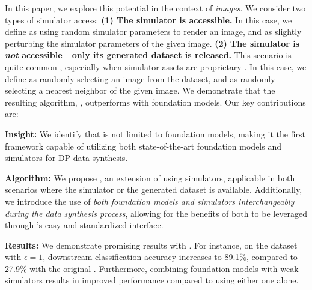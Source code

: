 In this paper, we explore this potential in the context of \emph{images}. 
We consider two types of simulator access:
\textbf{(1) The simulator is accessible.} In this case, we define \randomsampleapiname{} as using random simulator parameters to render an image, and \samplevariationapiname{} as slightly perturbing the simulator parameters of the given image.
\textbf{(2) The simulator is \emph{not} accessible—only its generated dataset is released.} This scenario is quite common \cite{wood2021fake,bae2023digiface}, especially when simulator assets are proprietary \cite{kar2019meta,devaranjan2020meta}. In this case, we define \randomsampleapiname{} as randomly selecting an image from the dataset, and \samplevariationapiname{} as randomly selecting a nearest neighbor of the given image.
We demonstrate that the resulting algorithm, \simpe{}, outperforms \pe{} with foundation models.
Our key contributions are:
\begin{packeditemize} 
\item \textbf{Insight:} We identify that \pe{} is not limited to foundation models, making it the first framework capable of utilizing both state-of-the-art foundation models and simulators for DP data synthesis. 
\item \textbf{Algorithm:} We propose \simpe{}, an extension of \pe{} using simulators, applicable in both scenarios where the simulator or the generated dataset is available. Additionally, we introduce the use of \emph{both foundation models and simulators interchangeably during the data synthesis process}, allowing for the benefits of both to be leveraged through \pe{}'s easy and standardized interface. 
\item \textbf{Results:} We demonstrate promising results with \simpe{}. For instance, on the \mnist{} dataset with $\epsilon=1$, downstream classification accuracy increases to 89.1\%, compared to 27.9\% with the original \pe{}. 
Furthermore, combining foundation models with weak simulators results in improved performance compared to using either one alone.
\end{packeditemize}

 



